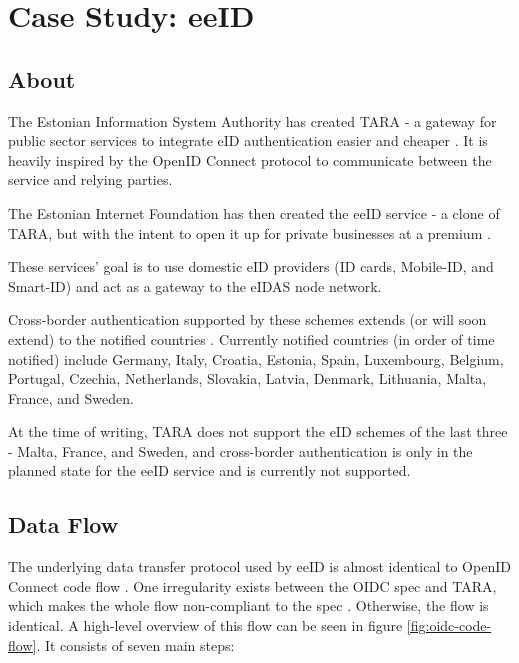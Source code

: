 \section{Case Study: eeID}

\subsection{About}

The Estonian Information System Authority has created TARA - a gateway for public sector services to integrate eID authentication easier and cheaper \cite{tara-business}. It is heavily inspired by the OpenID Connect \cite{tara-technical} protocol to communicate between the service and relying parties.

The Estonian Internet Foundation has then created the eeID service - a clone of TARA, but with the intent to open it up for private businesses at a premium \cite{eeid}.

These services' goal is to use domestic eID providers (ID cards, Mobile-ID, and Smart-ID) and act as a gateway to the eIDAS node network.

Cross-border authentication supported by these schemes extends (or will soon extend) to the notified countries \cite{eulaw-eidas-notified}. Currently notified countries (in order of time notified) include Germany, Italy, Croatia, Estonia, Spain, Luxembourg, Belgium, Portugal, Czechia, Netherlands, Slovakia, Latvia, Denmark, Lithuania, Malta, France, and Sweden.

At the time of writing, TARA does not support the eID schemes of the last three - Malta, France, and Sweden, and cross-border authentication is only in the planned state for the eeID service and is currently not supported.

\subsection{Data Flow}

The underlying data transfer protocol used by eeID is almost identical to OpenID Connect code flow \cite{tara-technical, oidc}. One irregularity exists between the OIDC spec and TARA, which makes the whole flow non-compliant to the spec \cite{tara-non-oidc-compliant}. Otherwise, the flow is identical. A high-level overview of this flow can be seen in figure \ref{fig:oidc-code-flow}. It consists of seven main steps:

